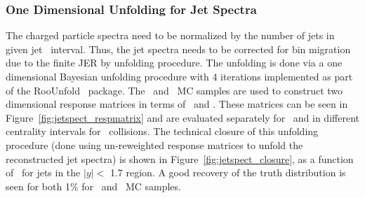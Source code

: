 \subsubsection{One Dimensional Unfolding for Jet Spectra}
\label{sec:1dunfolding}
The charged particle spectra need to be normalized by the number of jets in given jet \pt\ interval.
Thus, the jet spectra needs to be corrected for bin migration due to the finite JER by unfolding procedure.
The unfolding is done via a one dimensional Bayesian unfolding procedure with 4 iterations implemented as part of the RooUnfold~\cite{Adye:2011gm} package.
The \pp\ and \PbPb\ MC samples are used to construct two dimensional response matrices in terms of \ptjettruth\ and \ptjetreco.
These matrices can be seen in Figure~\ref{fig:jetspect_respmatrix} and are evaluated separately for \pp\ and in different centrality intervals for \PbPb\ collisions.
The technical closure of this unfolding procedure (done using un-reweighted response matrices to unfold the reconstructed jet spectra) is shown in Figure~\ref{fig:jetspect_closure}, as a function of \ptjet\ for jets in the $|y| < $ 1.7 region.
A good recovery of the truth distribution is seen for both 1\% for \pbpb\ and \pp\ MC samples.



